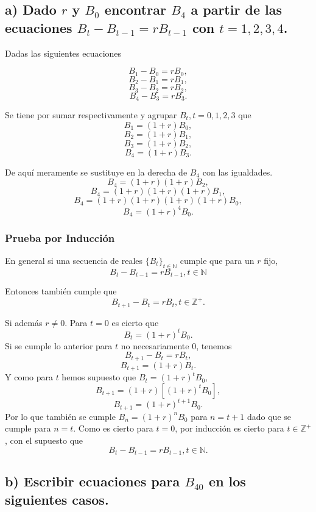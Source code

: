 \documentclass[11pt]{article}
\begin{document}
\hypertarget{a-dado-r-y-b_0-encontrar-b_4-a-partir-de-las-ecuaciones-b_t-b_t1-r-b_t1-con-t1234.}{%
\subsection{\texorpdfstring{a) Dado \(r\) y \(B_0\) encontrar \(B_4\) a
partir de las ecuaciones \(B_t − B_{t−1} = r B_{t−1}\) con
\(t=1,2,3,4\).}{a) Dado r y B\_0 encontrar B\_4 a partir de las ecuaciones B\_t − B\_\{t−1\} = r B\_\{t−1\} con t=1,2,3,4.}}\label{a-dado-r-y-b_0-encontrar-b_4-a-partir-de-las-ecuaciones-b_t-b_t1-r-b_t1-con-t1234.}}

    Dadas las siguientes ecuaciones

    \[B_1-B_{0}= r B_{0},\] \[B_2-B_{1}= r B_{1},\] \[B_3-B_{2}= r B_{2},\]
\[B_4-B_{3}= r B_{3}.\]

    Se tiene por sumar respectivamente y agrupar \(B_t,t=0,1,2,3\) que
\[B_1= (1+r) B_{0},\] \[B_2= (1+r) B_{1},\] \[B_3= (1+r) B_{2},\]
\[B_4= (1+r) B_{3}.\]

De aquí meramente se sustituye en la derecha de \(B_4\) con las
igualdades. \[B_4= (1+r) (1+r) B_{2},\]
\[B_4= (1+r) (1+r) (1+r) B_{1} ,\]
\[B_4= (1+r) (1+r) (1+r) (1+r) B_{0} ,\] \[B_4= (1+r)^4 B_0.\]

    \hypertarget{prueba-por-inducciuxf3n}{%
\subsubsection{Prueba por Inducción}\label{prueba-por-inducciuxf3n}}

En general si una secuencia de reales \(\{B_t\}_{t\in\mathbb N}\) cumple
que para un \(r\) fijo, \[B_t-B_{t-1}= r B_{t-1}, t\in\mathbb N\]

Entonces también cumple que \[B_{t+1} -B_t= rB_t, t\in\mathbb Z^+.\]

Si además \(r\neq 0\). Para \(t=0\) es cierto que \[B_t = (1+r)^t B_0.\]
Si se cumple lo anterior para \(t\) no necesariamente \(0\), tenemos
\[B_{t+1} -B_t= r B_t,\] \[B_{t+1} = (1+r)B_t.\] Y como para \(t\) hemos
supuesto que \(B_t = (1+r)^t B_0,\)
\[B_{t+1} = (1+r)\left[(1+r)^t B_0\right],\]
\[B_{t+1} = (1+r)^{t+1} B_0.\] Por lo que también se cumple
\(B_n = (1+r)^n B_0\) para \(n=t+1\) dado que se cumple para \(n=t\).
Como es cierto para \(t=0\), por inducción es cierto para
\(t\in\mathbb Z^+\), con el supuesto que
\[B_t-B_{t-1}= r B_{t-1}, t\in\mathbb N.\]

    \hypertarget{b-escribir-ecuaciones-para-b_40-en-los-siguientes-casos.}{%
\subsection{\texorpdfstring{b) Escribir ecuaciones para \(B_{40}\) en
los siguientes
casos.}{b) Escribir ecuaciones para B\_\{40\} en los siguientes casos.}}\label{b-escribir-ecuaciones-para-b_40-en-los-siguientes-casos.}}
\end{document}
